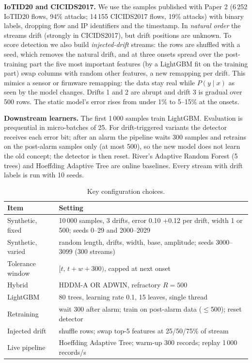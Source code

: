 \documentclass[conference]{IEEEtran}
\begin{document}
\textbf{IoTID20 and CICIDS2017.} We use the samples published with Paper 2 (6\,252 IoTID20 flows, 94\% attacks; 14\,155 CICIDS2017 flows, 19\% attacks) with binary labels, dropping flow and IP identifiers and the timestamp. In \emph{natural order} the streams drift (strongly in CICIDS2017), but drift positions are unknown. To score detection we also build \emph{injected-drift} streams: the rows are shuffled with a seed, which removes the natural drift, and at three onsets spread over the post-training part the five most important features (by a LightGBM fit on the training part) swap columns with random other features, a new remapping per drift. This mimics a sensor or firmware remapping: the data stay real while $P(y\mid x)$ as seen by the model changes. Drifts 1 and 2 are abrupt and drift 3 is gradual over 500 rows. The static model's error rises from under 1\% to 5--15\% at the onsets.

\textbf{Downstream learners.} The first 1\,000 samples train LightGBM. Evaluation is prequential in micro-batches of 25. For drift-triggered variants the detector receives each error bit; after an alarm the pipeline waits 300 samples and retrains on the post-alarm samples only (at most 500), so the new model does not learn the old concept; the detector is then reset. River's Adaptive Random Forest (5 trees) and Hoeffding Adaptive Tree are online baselines. Every stream with drift labels is run with 10 seeds.

\begin{table}[t]
\caption{Key configuration choices.}
\label{tab:cfg}
\centering\footnotesize\setlength{\tabcolsep}{3pt}
\begin{tabular}{@{}p{}p{}@{}}
\toprule
Item & Setting\\
\midrule
Synthetic, fixed & 10\,000 samples, 3 drifts, error 0.10 $+$0.12 per drift, width 1 or 500; seeds 0--29 and 2000--2029\\
Synthetic, varied & random length, drifts, width, base, amplitude; seeds 3000--3099 (300 streams)\\
Tolerance window & $[t,\,t+w+300)$, capped at next onset\\
Hybrid & HDDM-A OR ADWIN, refractory $R=500$\\
LightGBM & 80 trees, learning rate 0.1, 15 leaves, single thread\\
Retraining & wait 300 after alarm; train on post-alarm data ($\le$500); reset detector\\
Injected drift & shuffle rows; swap top-5 features at 25/50/75\% of stream\\
Live pipeline & Hoeffding Adaptive Tree; warm-up 300 records; replay 1\,000 records/s\\
\bottomrule
\end{tabular}
\end{table}
\end{document}
